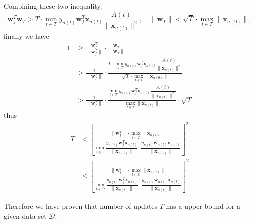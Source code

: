 Combining these two inequality,
\[
\mathbf{w}_f^T\mathbf{w}_T > T \cdot \min_{t \in T} y_{n(t)}\mathbf{w}_f^T\mathbf{x}_{n(t)} \frac{A(t)}{\|\mathbf{x}_{n(t)}\|^2}, \quad
\|\mathbf{w}_T\| < \sqrt T \cdot \max_{t\in T}\|\mathbf{x}_{n(0)}\|,
\]
finally we have 
\begin{align*}
1 
&\geq \frac{\mathbf{w}_f^T}{\|\mathbf{w}_f^T\|} \cdot \frac{\mathbf{w}_T}{\|\mathbf{w}_T\|}\\
&> \frac{1}{\|\mathbf{w}_f^T\|} \cdot \frac{
    T \cdot \min\limits_{t \in T} y_{n(t)}\mathbf{w}_f^T\mathbf{x}_{n(t)} \dfrac{A(t)}{\|\mathbf{x}_{n(t)}\|^2}
}{
    \sqrt{T} \cdot \max\limits_{t\in T}\|\mathbf{x}_{n(0)}\|
}\\
&> \frac{1}{\|\mathbf{w}_f^T\|} \cdot \frac{
    \min\limits_{t \in T} y_{n(t)}\mathbf{w}_f^T\mathbf{x}_{n(t)} \dfrac{A(t)}{\|\mathbf{x}_{n(t)}\|^2}
}{
    \max\limits_{t\in T}\|\mathbf{x}_{n(t)}\|
} \cdot \sqrt{T}
\end{align*}
thus
\begin{align*}
T
&< \left[\frac{
	\|\mathbf{w}_f^T\| \cdot \max\limits_{t \in T} \|\mathbf{x}_{n(t)}\|
}{
	\min\limits_{t \in T} 
		\dfrac{y_{n(t)}\mathbf{w}_f^T\mathbf{x}_{n(t)}}{\|\mathbf{x}_{n(t)}\|} 
	\cdot 
		\dfrac{y_{n(t)}\mathbf{w}_{n(t)}\mathbf{x}_{n(t)}}{\|\mathbf{x}_{n(t)}\|}
}\right]^2\\
&\leq \left[\frac{
	\|\mathbf{w}_f^T\| \cdot \max\limits_{t \in \mathcal{D}} \|\mathbf{x}_{n(t)}\|
}{
	\min\limits_{t \in \mathcal{D}} 
		\dfrac{y_{n(t)}\mathbf{w}_f^T\mathbf{x}_{n(t)}}{\|\mathbf{x}_{n(t)}\|} 
	\cdot 
		\dfrac{y_{n(t)}\mathbf{w}_{n(t)}\mathbf{x}_{n(t)}}{\|\mathbf{x}_{n(t)}\|}
}\right]^2
\end{align*}

Therefore we have proven that number of updates $T$ has a upper bound for a given data set $\mathcal{D}$. 

